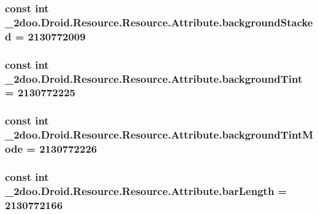\hypertarget{class__2doo_1_1_droid_1_1_resource_1_1_attribute_d95393c204251453ef2fd03e1e8e67cf}{
\subsubsection[{backgroundStacked}]{\setlength{\rightskip}{0pt plus 5cm}const int \_\-2doo.Droid.Resource.Resource.Attribute.backgroundStacked = 2130772009}}
\label{class__2doo_1_1_droid_1_1_resource_1_1_attribute_d95393c204251453ef2fd03e1e8e67cf}


\hypertarget{class__2doo_1_1_droid_1_1_resource_1_1_attribute_8d6a0328c830dfbd23bb535c07a4f92e}{
\subsubsection[{backgroundTint}]{\setlength{\rightskip}{0pt plus 5cm}const int \_\-2doo.Droid.Resource.Resource.Attribute.backgroundTint = 2130772225}}
\label{class__2doo_1_1_droid_1_1_resource_1_1_attribute_8d6a0328c830dfbd23bb535c07a4f92e}


\hypertarget{class__2doo_1_1_droid_1_1_resource_1_1_attribute_39e9488f6096ad965e5afce3e5c39a76}{
\subsubsection[{backgroundTintMode}]{\setlength{\rightskip}{0pt plus 5cm}const int \_\-2doo.Droid.Resource.Resource.Attribute.backgroundTintMode = 2130772226}}
\label{class__2doo_1_1_droid_1_1_resource_1_1_attribute_39e9488f6096ad965e5afce3e5c39a76}


\hypertarget{class__2doo_1_1_droid_1_1_resource_1_1_attribute_07d73b481b7926d2df05cc8286fb7fb4}{
\subsubsection[{barLength}]{\setlength{\rightskip}{0pt plus 5cm}const int \_\-2doo.Droid.Resource.Resource.Attribute.barLength = 2130772166}}
\label{class__2doo_1_1_droid_1_1_resource_1_1_attribute_07d73b481b7926d2df05cc8286fb7fb4}


